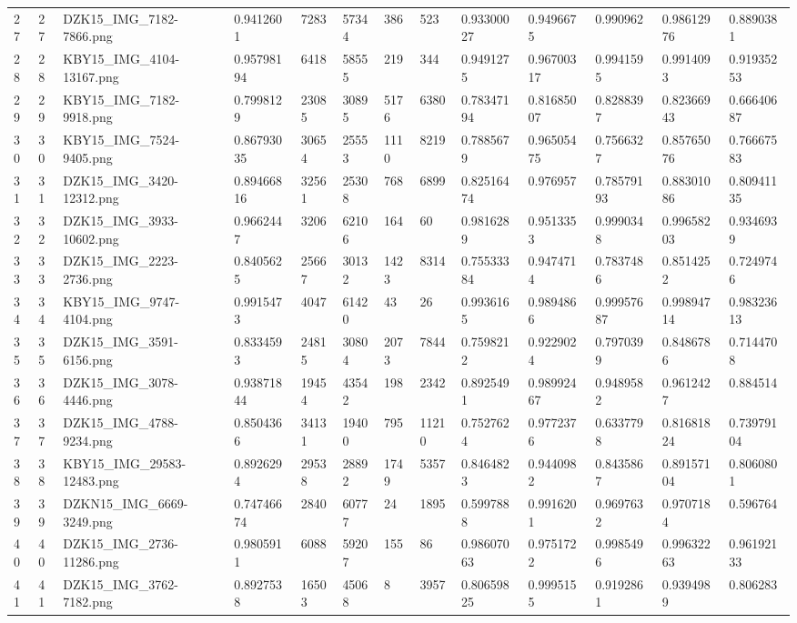 \documentclass[11pt, a4paper, twoside]{report}
\begin{document}
\begin{longtable}[c]{@{}lllllllllllll@{}}
27 & 27 & DZK15\_IMG\_7182-7866.png & 0.9412601 & 7283 & 57344 & 386 & 523 & 0.93300027 & 0.9496675 & 0.990962 & 0.98612976 & 0.8890381 \\
28 & 28 & KBY15\_IMG\_4104-13167.png & 0.95798194 & 6418 & 58555 & 219 & 344 & 0.9491275 & 0.96700317 & 0.9941595 & 0.9914093 & 0.91935253 \\
29 & 29 & KBY15\_IMG\_7182-9918.png & 0.7998129 & 23085 & 30895 & 5176 & 6380 & 0.78347194 & 0.81685007 & 0.8288397 & 0.82366943 & 0.66640687 \\
30 & 30 & KBY15\_IMG\_7524-9405.png & 0.86793035 & 30654 & 25553 & 1110 & 8219 & 0.7885679 & 0.96505475 & 0.7566327 & 0.85765076 & 0.76667583 \\
31 & 31 & DZK15\_IMG\_3420-12312.png & 0.89466816 & 32561 & 25308 & 768 & 6899 & 0.82516474 & 0.976957 & 0.78579193 & 0.88301086 & 0.80941135 \\
32 & 32 & DZK15\_IMG\_3933-10602.png & 0.9662447 & 3206 & 62106 & 164 & 60 & 0.9816289 & 0.9513353 & 0.9990348 & 0.99658203 & 0.9346939 \\
33 & 33 & DZK15\_IMG\_2223-2736.png & 0.8405625 & 25667 & 30132 & 1423 & 8314 & 0.75533384 & 0.9474714 & 0.7837486 & 0.8514252 & 0.7249746 \\
34 & 34 & KBY15\_IMG\_9747-4104.png & 0.9915473 & 4047 & 61420 & 43 & 26 & 0.9936165 & 0.9894866 & 0.99957687 & 0.99894714 & 0.98323613 \\
35 & 35 & DZK15\_IMG\_3591-6156.png & 0.8334593 & 24815 & 30804 & 2073 & 7844 & 0.7598212 & 0.9229024 & 0.7970399 & 0.8486786 & 0.7144708 \\
36 & 36 & DZK15\_IMG\_3078-4446.png & 0.93871844 & 19454 & 43542 & 198 & 2342 & 0.8925491 & 0.98992467 & 0.9489582 & 0.9612427 & 0.884514 \\
37 & 37 & DZK15\_IMG\_4788-9234.png & 0.8504366 & 34131 & 19400 & 795 & 11210 & 0.7527624 & 0.9772376 & 0.6337798 & 0.81681824 & 0.73979104 \\
38 & 38 & KBY15\_IMG\_29583-12483.png & 0.8926294 & 29538 & 28892 & 1749 & 5357 & 0.8464823 & 0.9440982 & 0.8435867 & 0.89157104 & 0.8060801 \\
39 & 39 & DZKN15\_IMG\_6669-3249.png & 0.74746674 & 2840 & 60777 & 24 & 1895 & 0.5997888 & 0.9916201 & 0.9697632 & 0.9707184 & 0.596764 \\
40 & 40 & DZK15\_IMG\_2736-11286.png & 0.9805911 & 6088 & 59207 & 155 & 86 & 0.98607063 & 0.9751722 & 0.9985496 & 0.99632263 & 0.96192133 \\
41 & 41 & DZK15\_IMG\_3762-7182.png & 0.8927538 & 16503 & 45068 & 8 & 3957 & 0.80659825 & 0.9995155 & 0.9192861 & 0.9394989 & 0.806283 \\

\end{longtable}
\end{document}
